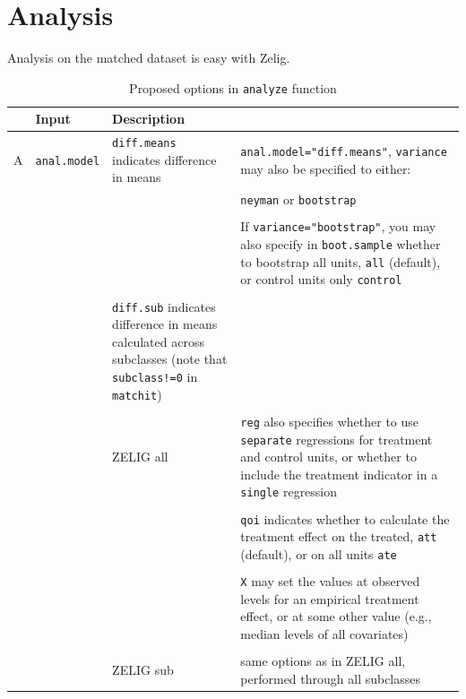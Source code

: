 \documentclass[oneside,letterpaper,titlepage]{article}
\begin{document}
\section{Analysis}

Analysis on the matched dataset is easy with Zelig.


\begin{table}[tbp]
  \begin{center}
    \small
    \begin{tabular}{lp{0.6in}p{2.25in}p{2.25in}}
      \hline
      & Input & Description \\ 
      \hline
      A & \texttt{anal.model} & \texttt{diff.means} indicates
      difference in means & \texttt{anal.model="diff.means"},
      \texttt{variance} may also be specified to either:\\
      & & & \texttt{neyman} or \texttt{bootstrap}\\\\
      & & & If \texttt{variance="bootstrap"}, you may also specify
      in \texttt{boot.sample} whether to bootstrap all units,
      \texttt{all} (default), or control units only \texttt{control}\\
      \\
      & & \texttt{diff.sub} indicates difference in means calculated
      across subclasses (note that \texttt{subclass!=0} in
      \texttt{matchit})\\ \\ 
      & & ZELIG all & \texttt{reg} also specifies whether to use
      \texttt{separate} regressions for treatment and control units,
      or whether to include the treatment indicator in a
      \texttt{single} regression \\\\
      & & & \texttt{qoi} indicates whether to calculate the treatment
      effect on the treated, \texttt{att} (default), or on all units
      \texttt{ate} \\ \\
      & & & \texttt{X} may set the values at observed levels for an
      empirical treatment effect, or at some other value (e.g., median
      levels of all covariates) \\ \\
      & & ZELIG sub & same options as in ZELIG all, performed through
      all subclasses\\
      \hline
    \end{tabular}
    \caption{Proposed options in \texttt{analyze} function}
    \label{analyze}
  \end{center}
\end{table}
\end{document}
